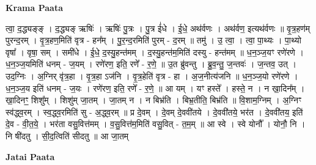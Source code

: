\documentclass[17pt]{extarticle}
\begin{document}
\textbf{Krama Paata} \newline

त्वा॒ द॒द्ध्यङ्ङ् । द॒द्ध्यङ् ऋषिः॑ । ऋषिः॑ पु॒त्रः । पु॒त्र ई॑धे । ई॒धे॒ अथ॑र्वणः । अथ॑र्वण॒ इत्यथ॑र्वणः ॥ वृ॒त्र॒हण॑म् पुरन्द॒रम् । वृ॒त्र॒हण॒मिति॑ वृत्र - हन᳚म् । पु॒र॒न्द॒रमिति॑ पुरम् - द॒रम् ॥ तमु॑ । उ॒ त्वा॒ । त्वा॒ पा॒थ्यः । पा॒थ्यो वृषा᳚ । वृषा॒ सम् । समी॑धे । ई॒धे॒ द॒स्यु॒हन्त॑मम् । द॒स्यु॒हन्त॑म॒मिति॑ दस्यु - हन्त॑मम् ॥ ध॒न॒ञ्ज॒यꣳ रणे॑रणे । ध॒न॒ञ्ज॒यमिति॑ धनम् - ज॒यम् । रणे॑रण॒ इति॒ रणे᳚ - र॒णे॒ ॥ उ॒त ब्रु॑वन्तु । ब्रु॒व॒न्तु॒ ज॒न्तवः॑ । ज॒न्तव॒ उत् । उद॒ग्निः । अ॒ग्निर् वृ॑त्र॒हा । वृ॒त्र॒हा ऽज॑नि । वृ॒त्र॒हेति॑ वृत्र - हा । अ॒ज॒नीत्य॑जनि ॥ ध॒न॒ञ्ज॒यो रणे॑रणे । ध॒न॒ञ्ज॒य इति॑ धनम् - ज॒यः । रणे॑रण॒ इति॒ रणे᳚ - र॒णे॒ ॥ आ यम् । यꣳ हस्ते᳚ । हस्ते॒ न । न खा॒दिन᳚म् । खा॒दिनꣳ॒॒ शिशु᳚म् । शिशु॑म् जा॒तम् । जा॒तम् न । न बिभ्र॑ति । बिभ्र॒तीति॒ बिभ्र॑ति ॥ वि॒शाम॒ग्निम् । अ॒ग्निꣳ स्व॑द्ध्व॒रम् । स्व॒द्ध्व॒रमिति॑ सु - अ॒द्ध्व॒रम् ॥ प्र दे॒वम् । दे॒वम् दे॒ववी॑तये । दे॒ववी॑तये॒ भर॑त । दे॒ववी॑तय॒ इति॑ दे॒व - वी॒त॒ये॒ । भर॑ता वसु॒वित्त॑मम् । व॒सु॒वित्त॑म॒मिति॑ वसु॒वित् - त॒म॒म् ॥ आ स्वे । स्वे योनौ᳚ । योनौ॒ नि । 
नि षी॑दतु । सी॒द॒त्विति॑ सीदतु ॥ आ जा॒तम् \newline

\textbf{Jatai Paata} \newline
\end{document}
